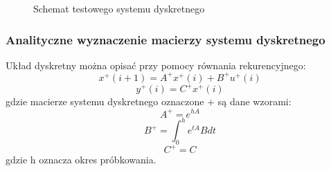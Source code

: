 \documentclass[a4paper,11pt]{article}
\begin{document}
\begin{figure}[H]
\centering
{}
\caption{Schemat testowego systemu dyskretnego}
\label{fig:dys_1}
\end{figure}

\subsubsection{Analityczne wyznaczenie macierzy systemu dyskretnego}
Układ dyskretny można opisać przy pomocy równania rekurencyjnego:
\begin{equation*}
x^{+}(i+1)=A^{+}x^{+}(i)+B^{+}u^{+}(i)
\end{equation*}
\begin{equation*}
y^{+}(i)=C^{+}x^{+}(i)
\end{equation*}
gdzie macierze systemu dyskretnego oznaczone \(+\) są dane wzorami:
\begin{equation*}
A^{+}=e^{hA}
\end{equation*}
\begin{equation*}
B^{+}= \int_{0}^{h} e^{tA}Bdt
\end{equation*}
\begin{equation*}
C^{+}=C 
\end{equation*}
gdzie h oznacza okres próbkowania.
\end{document}
